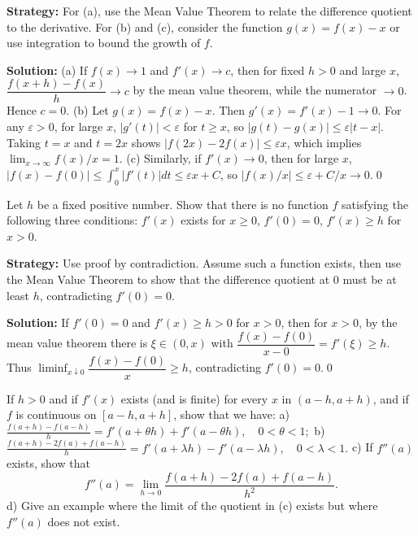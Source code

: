 \noindent\textbf{Strategy:} For (a), use the Mean Value Theorem to relate the difference quotient to the derivative. For (b) and (c), consider the function \( g(x) = f(x) - x \) or use integration to bound the growth of \( f \).

\bigskip\noindent\textbf{Solution:}
(a) If $f(x)\to 1$ and $f'(x)\to c$, then for fixed $h>0$ and large $x$, $\dfrac{f(x+h)-f(x)}{h}\to c$ by the mean value theorem, while the numerator $\to 0$. Hence $c=0$. (b) Let $g(x)=f(x)-x$. Then $g'(x)=f'(x)-1\to 0$. For any $\varepsilon>0$, for large $x$, $|g'(t)|<\varepsilon$ for $t\ge x$, so $|g(t)-g(x)|\le \varepsilon|t-x|$. Taking $t=x$ and $t=2x$ shows $|f(2x)-2f(x)|\le \varepsilon x$, which implies $\lim_{x\to\infty}f(x)/x=1$. (c) Similarly, if $f'(x)\to 0$, then for large $x$, $|f(x)-f(0)|\le \int_0^x|f'(t)|dt\le \varepsilon x+C$, so $|f(x)/x|\le \varepsilon+C/x\to 0$.\qed


\begin{problembox}
Let \( h \) be a fixed positive number. Show that there is no function \( f \) satisfying the following three conditions: \( f'(x) \) exists for \( x \geq 0 \), \( f'(0) = 0 \), \( f'(x) \geq h \) for \( x > 0 \).
\end{problembox}

\noindent\textbf{Strategy:} Use proof by contradiction. Assume such a function exists, then use the Mean Value Theorem to show that the difference quotient at 0 must be at least \( h \), contradicting \( f'(0) = 0 \).

\bigskip\noindent\textbf{Solution:}
If $f'(0)=0$ and $f'(x)\ge h>0$ for $x>0$, then for $x>0$, by the mean value theorem there is $\xi\in(0,x)$ with $\dfrac{f(x)-f(0)}{x-0}=f'(\xi)\ge h$. Thus $\liminf_{x\downarrow 0}\dfrac{f(x)-f(0)}{x}\ge h$, contradicting $f'(0)=0$.\qed


\begin{problembox}
If \( h > 0 \) and if \( f'(x) \) exists (and is finite) for every \( x \) in \( (a - h, a + h) \), and if \( f \) is continuous on \( [a - h, a + h] \), show that we have:
a) \( \frac{f(a + h) - f(a - h)}{h} = f'(a + \theta h) + f'(a - \theta h), \quad 0 < \theta < 1; \)
b) \( \frac{f(a + h) - 2f(a) + f(a - h)}{h} = f'(a + \lambda h) - f'(a - \lambda h), \quad 0 < \lambda < 1. \)
c) If \( f''(a) \) exists, show that
\[ f''(a) = \lim_{h \to 0} \frac{f(a + h) - 2f(a) + f(a - h)}{h^2}. \]
d) Give an example where the limit of the quotient in (c) exists but where \( f''(a) \) does not exist.
\end{problembox}


